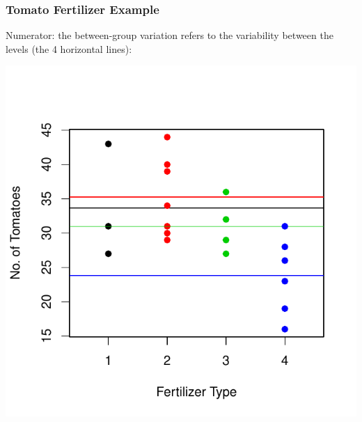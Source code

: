 \documentclass[handout]{beamer}
\newcommand{\blue}[1]{\textcolor{blue2}{#1}}
\begin{document}
\begin{frame}
\frametitle{Tomato Fertilizer Example}
Numerator: the \blue{between-group variation} refers to the variability \blue{between} the levels (the 4 horizontal lines):  
\begin{center}
\includegraphics{figure/lec22-006}
\end{center}
\end{frame}
\end{document}

